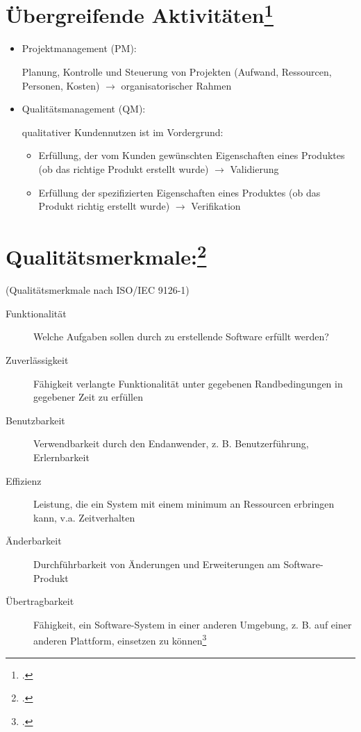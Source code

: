 \documentclass{lehramt-informatik-haupt}
\begin{document}
\section{Übergreifende Aktivitäten\footcite[Seite 11]{sosy:fs:1}}

\begin{itemize}
\item Projektmanagement (PM):

Planung, Kontrolle und Steuerung von Projekten (Aufwand, Ressourcen,
Personen, Kosten) $\rightarrow$ organisatorischer Rahmen

\item Qualitätsmanagement (QM):

qualitativer Kundennutzen ist im Vordergrund:

\begin{itemize}
\item Erfüllung, der vom Kunden gewünschten Eigenschaften eines Produktes
(ob das richtige Produkt erstellt wurde) $\rightarrow$ Validierung

\item Erfüllung der spezifizierten Eigenschaften eines Produktes
(ob das Produkt richtig erstellt wurde) $\rightarrow$ Verifikation
\end{itemize}

\end{itemize}

\section{Qualitätsmerkmale:\footcite[Seite 12]{sosy:fs:1}}

(Qualitätsmerkmale nach ISO/IEC 9126-1)

\begin{description}

\item[Funktionalität]
Welche Aufgaben sollen durch zu erstellende Software erfüllt werden?

\item[Zuverlässigkeit]
Fähigkeit verlangte Funktionalität unter gegebenen Randbedingungen in
gegebener Zeit zu erfüllen

\item[Benutzbarkeit]
Verwendbarkeit durch den Endanwender, z. B. Benutzerführung,
Erlernbarkeit

\item[Effizienz]
Leistung, die ein System mit einem minimum an Ressourcen erbringen kann,
v.a. Zeitverhalten

\item[Änderbarkeit]
Durchführbarkeit von Änderungen und Erweiterungen am Software-Produkt

\item[Übertragbarkeit]
Fähigkeit, ein Software-System in einer anderen Umgebung, z. B. auf
einer anderen Plattform, einsetzen zu können\footcite[Seite
15-16]{schatten}
\end{description}
\end{document}
